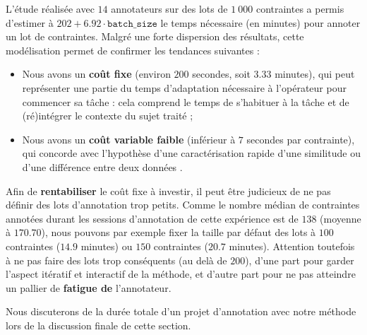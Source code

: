 			L'étude réalisée avec $14$ annotateurs sur des lots de $1~000$ contraintes a permis d'estimer à $202 + 6.92 \cdot \texttt{batch\_size}$ le temps nécessaire (en minutes) pour annoter un lot de contraintes.
			Malgré une forte dispersion des résultats, cette modélisation permet de confirmer les tendances suivantes :
			\begin{itemize}
				\item Nous avons un \textbf{coût fixe} (environ $200$ secondes, soit $3.33$ minutes), qui peut représenter une partie du temps d'adaptation nécessaire à l'opérateur pour commencer sa tâche  : cela comprend le temps de s'habituer à la tâche et de (ré)intégrer le contexte du sujet traité ;
				\item Nous avons un \textbf{coût variable faible} (inférieur à $7$ secondes par contrainte), qui concorde avec l'hypothèse d'une caractérisation rapide d'une similitude ou d'une différence entre deux données .
			\end{itemize}
			Afin de \textbf{rentabiliser} le coût fixe à investir, il peut être judicieux de ne pas définir des lots d’annotation trop petits. 
			Comme le nombre médian de contraintes annotées durant les sessions d'annotation de cette expérience est de $138$ (moyenne à $170.70$), nous pouvons par exemple fixer la taille par défaut des lots à $100$ contraintes ($14.9$ minutes) ou $150$ contraintes ($20.7$ minutes).
			Attention toutefois à ne pas faire des lots trop conséquents (au delà de $200$), d'une part pour garder l'aspect itératif et interactif de la méthode, et d'autre part pour ne pas atteindre un pallier de \textbf{fatigue de} l'annotateur.
			
			Nous discuterons de la durée totale d'un projet d'annotation avec notre méthode lors de la discussion finale de cette section.
		
